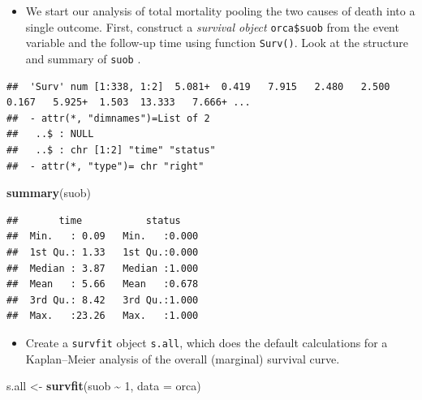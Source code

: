 \documentclass[
]{book}
\newenvironment{Shaded}{\begin{snugshade}}{\end{snugshade}}
\newcommand{\AttributeTok}[1]{\textcolor[rgb]{0.13,0.29,0.53}{#1}}
\newcommand{\DecValTok}[1]{\textcolor[rgb]{0.00,0.00,0.81}{#1}}
\newcommand{\FunctionTok}[1]{\textcolor[rgb]{0.13,0.29,0.53}{\textbf{#1}}}
\newcommand{\NormalTok}[1]{#1}
\newcommand{\OtherTok}[1]{\textcolor[rgb]{0.56,0.35,0.01}{#1}}
\newcommand{\SpecialCharTok}[1]{\textcolor[rgb]{0.81,0.36,0.00}{\textbf{#1}}}
\providecommand{\tightlist}{%
  \setlength{\itemsep}{0pt}\setlength{\parskip}{0pt}}
\begin{document}
\begin{itemize}
\tightlist
\item
  We start our analysis of total mortality pooling the two causes of death into
  a single outcome.
  First, construct a \emph{survival object} \texttt{orca\$suob} from
  the event variable and the follow-up time using function \texttt{Surv()}.
  Look at the structure and summary of \texttt{suob} .
\end{itemize}

\begin{Shaded}
\end{Shaded}

\begin{verbatim}
##  'Surv' num [1:338, 1:2]  5.081+  0.419   7.915   2.480   2.500   0.167   5.925+  1.503  13.333   7.666+ ...
##  - attr(*, "dimnames")=List of 2
##   ..$ : NULL
##   ..$ : chr [1:2] "time" "status"
##  - attr(*, "type")= chr "right"
\end{verbatim}

\begin{Shaded}
\begin{Highlighting}[]
\FunctionTok{summary}\NormalTok{(suob)}
\end{Highlighting}
\end{Shaded}

\begin{verbatim}
##       time           status     
##  Min.   : 0.09   Min.   :0.000  
##  1st Qu.: 1.33   1st Qu.:0.000  
##  Median : 3.87   Median :1.000  
##  Mean   : 5.66   Mean   :0.678  
##  3rd Qu.: 8.42   3rd Qu.:1.000  
##  Max.   :23.26   Max.   :1.000
\end{verbatim}

\begin{itemize}
\tightlist
\item
  Create a \texttt{survfit} object \texttt{s.all}, which does the
  default calculations for a Kaplan--Meier
  analysis of the overall (marginal) survival curve.
\end{itemize}

\begin{Shaded}
\begin{Highlighting}[]
\NormalTok{s.all }\OtherTok{\textless{}{-}} \FunctionTok{survfit}\NormalTok{(suob }\SpecialCharTok{\textasciitilde{}} \DecValTok{1}\NormalTok{, }\AttributeTok{data =}\NormalTok{ orca)}
\end{Highlighting}
\end{Shaded}
\end{document}
